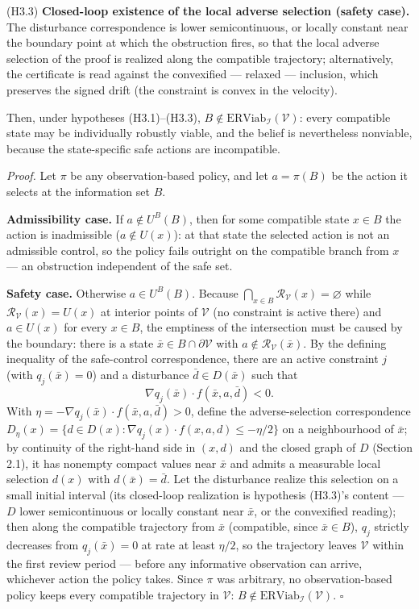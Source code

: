 \documentclass[11pt]{article}
\begin{document}
(H3.3) \textbf{Closed-loop existence of the local adverse selection
(safety case).} The disturbance correspondence is lower semicontinuous,
or locally constant near the boundary point at which the obstruction
fires, so that the local adverse selection of the proof is realized
along the compatible trajectory; alternatively, the certificate is read
against the convexified --- relaxed --- inclusion, which preserves the
signed drift (the constraint is convex in the velocity).

Then, under hypotheses (H3.1)--(H3.3),
\(B \notin \mathrm{ERViab}_{\mathcal{I}}(\mathcal{V})\): every
compatible state may be individually robustly viable, and the belief is
nevertheless nonviable, because the state-specific safe actions are
incompatible.

\emph{Proof.} Let \(\pi\) be any observation-based policy, and let
\(a = \pi(B)\) be the action it selects at the information set \(B\).

\textbf{Admissibility case.} If \(a \notin U^B(B)\), then for some
compatible state \(x \in B\) the action is inadmissible
(\(a \notin U(x)\)): at that state the selected action is not an
admissible control, so the policy fails outright on the compatible
branch from \(x\) --- an obstruction independent of the safe set.

\textbf{Safety case.} Otherwise \(a \in U^B(B)\). Because
\(\bigcap_{x \in B} \mathcal{R}_{\mathcal{V}}(x) = \varnothing\) while
\(\mathcal{R}_{\mathcal{V}}(x) = U(x)\) at interior points of
\(\mathcal{V}\) (no constraint is active there) and \(a \in U(x)\) for
every \(x \in B\), the emptiness of the intersection must be caused by
the boundary: there is a state
\(\bar x \in B \cap \partial \mathcal{V}\) with
\(a \notin \mathcal{R}_{\mathcal{V}}(\bar x)\). By the defining
inequality of the safe-control correspondence, there are an active
constraint \(j\) (with \(q_j(\bar x) = 0\)) and a disturbance
\(\bar d \in D(\bar x)\) such that
\[\nabla q_j(\bar x) \cdot f(\bar x, a, \bar d) < 0.\] With
\(\eta = - \nabla q_j(\bar x) \cdot f(\bar x, a, \bar d) > 0\), define
the adverse-selection correspondence
\(D_{\eta}(x) = \{ d \in D(x) : \nabla q_j(x) \cdot f(x, a, d) \le -\eta/2 \}\)
on a neighbourhood of \(\bar x\); by continuity of the right-hand side
in \((x,d)\) and the closed graph of \(D\) (Section 2.1), it has
nonempty compact values near \(\bar x\) and admits a measurable local
selection \(d(x)\) with \(d(\bar x) = \bar d\). Let the disturbance
realize this selection on a small initial interval (its closed-loop
realization is hypothesis (H3.3)'s content --- \(D\) lower
semicontinuous or locally constant near \(\bar x\), or the convexified
reading); then along the compatible trajectory from \(\bar x\)
(compatible, since \(\bar x \in B\)), \(q_j\) strictly decreases from
\(q_j(\bar x) = 0\) at rate at least \(\eta/2\), so the trajectory
leaves \(\mathcal{V}\) within the first review period --- before any
informative observation can arrive, whichever action the policy takes.
Since \(\pi\) was arbitrary, no observation-based policy keeps every
compatible trajectory in \(\mathcal{V}\):
\(B \notin \mathrm{ERViab}_{\mathcal{I}}(\mathcal{V})\). \ensuremath{\square}
\end{document}
